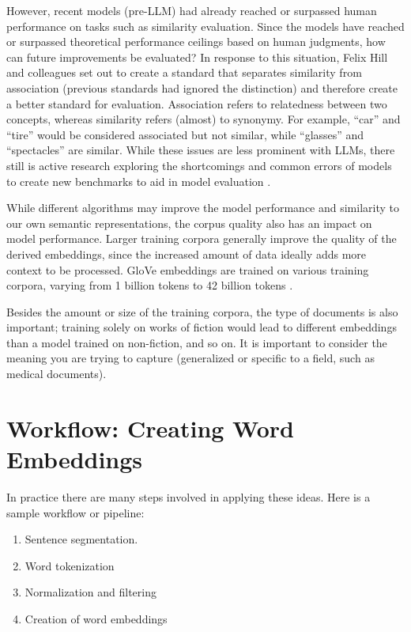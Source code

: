 However, recent models (pre-LLM) had already reached or surpassed human performance on tasks such as similarity evaluation. Since the models have reached or surpassed theoretical performance ceilings based on human judgments, how can future improvements be evaluated? In response to this situation, Felix Hill and colleagues \cite{hill2015simlex} set out to create a standard that separates similarity from association (previous standards had ignored the distinction) and therefore create a better standard for evaluation. Association refers to relatedness between two concepts, whereas similarity refers (almost) to synonymy. For example, ``car'' and ``tire'' would be considered associated but not similar, while ``glasses'' and ``spectacles'' are similar. While these issues are less prominent with LLMs, there still is active research exploring the shortcomings and common errors of models to create new benchmarks to aid in model evaluation \cite{bugliarello2023measuring}.

While different algorithms may improve the model performance and similarity to our own semantic representations, the corpus quality also has an impact on model performance. Larger training corpora generally improve the quality of the derived embeddings, since the increased amount of data ideally adds more context to be processed. GloVe embeddings are trained on various training corpora, varying from 1 billion tokens to 42 billion tokens \cite{pennington2014glove}.

Besides the amount or size of the training corpora, the type of documents is also important; training solely on works of fiction would lead to different embeddings than a model trained on non-fiction, and so on. It is important to consider the meaning you are trying to capture (generalized or specific to a field, such as medical documents).

\section{Workflow: Creating Word Embeddings}\label{createWordEmbeddings}

In practice there are many steps involved in applying these ideas. Here is a sample workflow or pipeline:
\begin{enumerate}
\item Sentence segmentation.
\item Word tokenization
\item Normalization and filtering
\item Creation of word embeddings
\end{enumerate}

